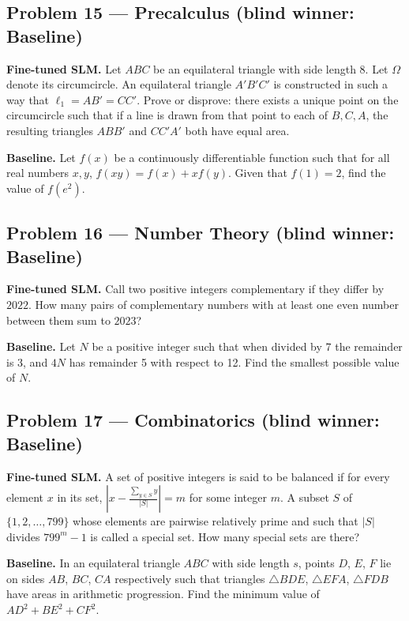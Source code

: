 \documentclass[11pt]{article}
\begin{document}
\subsection*{Problem 15 --- Precalculus \quad (blind winner: Baseline)}

\textbf{Fine-tuned SLM.} Let $ABC$ be an equilateral triangle with side length 8. Let $\Omega$ denote its circumcircle. An equilateral triangle $A'B'C'$ is constructed in such a way that $\ell_1 = AB' = CC'$. Prove or disprove: there exists a unique point on the circumcircle such that if a line is drawn from that point to each of $B,C,A$, the resulting triangles $ABB'$ and $CC'A'$ both have equal area.

\medskip

\textbf{Baseline.} Let $f(x)$ be a continuously differentiable function such that for all real numbers $x,y$, $f(xy) = f(x) + xf(y)$. Given that $f(1) = 2$, find the value of $f(e^2)$.

\subsection*{Problem 16 --- Number Theory \quad (blind winner: Baseline)}

\textbf{Fine-tuned SLM.} Call two positive integers complementary if they differ by $2022$. How many pairs of complementary numbers with at least one even number between them sum to $2023$?

\medskip

\textbf{Baseline.} Let $N$ be a positive integer such that when divided by 7 the remainder is 3, and $4N$ has remainder 5 with respect to 12. Find the smallest possible value of $N$.

\subsection*{Problem 17 --- Combinatorics \quad (blind winner: Baseline)}

\textbf{Fine-tuned SLM.} A set of positive integers is said to be balanced if for every element $x$ in its set, $|x-\frac{\sum_{y \in S} y}{|S|}| = m$ for some integer $m$. A subset $S$ of $\{1,2,\ldots,799\}$ whose elements are pairwise relatively prime and such that $|S|$ divides $799^{m}-1$ is called a special set. How many special sets are there?

\medskip

\textbf{Baseline.} In an equilateral triangle $ABC$ with side length $s$, points $D$, $E$, $F$ lie on sides $AB$, $BC$, $CA$ respectively such that triangles $\triangle BDE$, $\triangle EFA$, $\triangle FDB$ have areas in arithmetic progression. Find the minimum value of $AD^2 + BE^2 + CF^2$.
\end{document}

